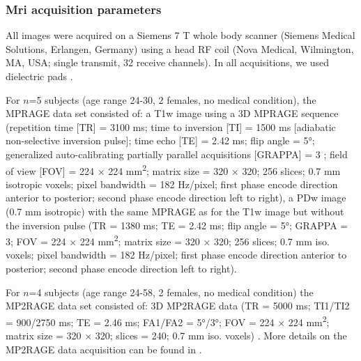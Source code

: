 \subsubsection{Mri acquisition parameters}
All images were acquired on a Siemens 7 T whole body scanner (Siemens Medical Solutions, Erlangen, Germany) using a head RF coil (Nova Medical, Wilmington, MA, USA; single transmit, 32 receive channels). In all acquisitions, we used dielectric pads \parencite{Teeuwisse2012}.

For $n$=5 subjects (age range 24-30, 2 females, no medical condition), the MPRAGE data set consisted of: a T1w image using a 3D MPRAGE sequence (repetition time [TR] = 3100 ms; time to inversion [TI] = 1500 ms [adiabatic non-selective inversion pulse]; time echo [TE] = 2.42 ms; flip angle = 5°; generalized auto-calibrating partially parallel acquisitions [GRAPPA] = 3 \parencite{Griswold2002}; field of view [FOV] = 224 × 224 mm\textsuperscript{2}; matrix size = 320 × 320; 256 slices; 0.7 mm isotropic voxels; pixel bandwidth = 182 Hz/pixel; first phase encode direction anterior to posterior; second phase encode direction left to right), a PDw image (0.7 mm isotropic) with the same MPRAGE as for the T1w image but without the inversion pulse (TR = 1380 ms; TE = 2.42 ms; flip angle = 5°; GRAPPA = 3; FOV = 224 × 224 mm\textsuperscript{2}; matrix size = 320 × 320; 256 slices; 0.7 mm iso. voxels; pixel bandwidth = 182 Hz/pixel; first phase encode direction anterior to posterior; second phase encode direction left to right).

For $n$=4 subjects (age range 24-58, 2 females, no medical condition) the MP2RAGE data set consisted of: 3D MP2RAGE data (TR = 5000 ms; TI1/TI2 = 900/2750 ms; TE = 2.46 ms; FA1/FA2 = 5°/3°; FOV = 224 × 224 mm\textsuperscript{2}; matrix size = 320 × 320; slices = 240; 0.7 mm iso. voxels) \parencite{Marques2010}. More details on the MP2RAGE data acquisition can be found in \cite{Haast2016}.

